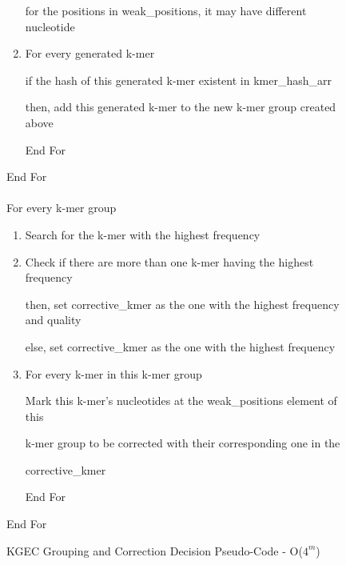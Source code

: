 \documentclass[12pt,openany]{llncs}
\begin{document}
\begin{figure}
\begin{bordered}
\begin{enumerate}
      \noindent\hspace{1cm} for the positions in weak\_positions, it may have different nucleotide
      
      \item For every generated k-mer
	
		\noindent\hspace{1.4cm} if the hash of this generated k-mer existent in kmer\_hash\_arr 
		
		\noindent\hspace{1.4cm} then, add this generated k-mer to the new k-mer group created above
		
		\noindent\hspace{1cm} End For

\end{enumerate}            
\vspace{-3mm}
End For
\\
\\
For every k-mer group 
\vspace{-3mm}
\begin{enumerate}
\addtolength{\itemindent}{1cm}
  \item Search for the k-mer with the highest frequency 

  \item Check if there are more than one k-mer having the highest frequency

  \noindent\hspace{1cm} then, set corrective\_kmer as the one with the highest frequency and quality

  \noindent\hspace{1cm} else, set corrective\_kmer as the one with the highest frequency

  \item For every k-mer in this k-mer group

  \noindent\hspace{1.4cm}Mark this k-mer's nucleotides at the weak\_positions element of this    
  
  \noindent\hspace{1.4cm}k-mer group to be corrected with their corresponding one in the 
  
  \noindent\hspace{1.4cm}corrective\_kmer
  
  \noindent\hspace{1cm} End For
\end{enumerate}            
\vspace{-3mm}
End For		
\end{bordered}
\caption{\label{fig:fig-KGEC-ALG}KGEC Grouping and Correction Decision Pseudo-Code - O(\textit{$4^m$})}
\end{figure}
\end{document}
